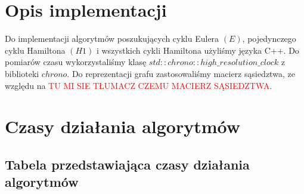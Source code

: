 \documentclass[polish,polish,a4paper]{article}
\begin{document}
\begin{spacing}{1.25}

\section{Opis implementacji }
 
 Do implementacji algorytmów poszukujących cyklu Eulera $(E)$, pojedynczego cyklu Hamiltona $(H1)$ i wszystkich cykli Hamiltona użyliśmy języka C++. Do pomiarów czasu wykorzystaliśmy klasę $std :: chrono :: high\_resolution\_clock$ z biblioteki $chrono$. Do reprezentacji grafu zastosowaliśmy macierz sąsiedztwa, ze względu na {\Huge \textcolor{red}{TU MI SIE TŁUMACZ CZEMU MACIERZ SĄSIEDZTWA}}.  

\section{Czasy działania algorytmów}


\begin{spacing}{1.3}
	
	{
		\centering
		\subsection*{Tabela przedstawiająca czasy działania algorytmów }
	}
	

\end{spacing}
\end{spacing}
\end{document}
